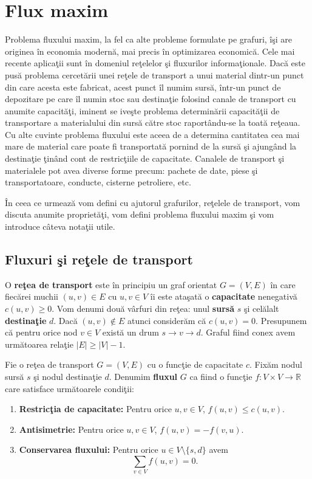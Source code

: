 \documentclass[11pt,a4paper]{report}
\newcommand{\R}{\mathbb{R}}
\begin{document}
 	\chapter{Flux maxim} 
 
 
 	Problema fluxului maxim, la fel ca alte probleme formulate pe grafuri, \^ i\c si are originea \^ in economia modern\u a, mai precis \^ in optimizarea economic\u a. Cele mai recente aplica\c tii sunt \^ in domeniul re\c telelor \c si fluxurilor informa\c tionale. Dac\u a este pus\u a problema cercet\u arii unei re\c tele de transport a unui material dintr-un punct din care acesta este fabricat, acest punct \^ il numim surs\u a, \^ intr-un punct de depozitare pe care \^ il numin stoc sau destina\c tie folosind canale de transport cu anumite capacit\u a\c ti, iminent se ive\c ste  problema determin\u arii capacit\u a\c tii de transportare a materialului din surs\u a c\u atre stoc raport\^ andu-se la toat\u a re\c teaua. Cu alte cuvinte problema fluxului este aceea de a determina cantitatea cea mai mare de material care poate fi transportat\u a pornind de la surs\u a \c si ajung\^ and la destina\c tie \c tin\^ and cont de restric\c tiile de capacitate. Canalele de transport \c si materialele pot avea diverse forme precum: pachete de date, piese \c si transportatoare, conducte, cisterne petroliere, etc.
 	
 	\^ In ceea ce urmeaz\u a vom defini cu ajutorul grafurilor, re\c telele de transport, vom discuta anumite propriet\u a\c ti, vom defini problema fluxului maxim \c si vom introduce c\^ ateva nota\c tii utile.
 	\section{Fluxuri \c si re\c tele de transport}
 	
 	O \textbf{re\c tea de transport} este \^ in principiu un graf orientat $G=(V,E)$ \^ in care fiec\u arei muchii $(u,v)\in E$ cu $u,v \in V$ \^ ii este ata\c sat\u a o \textbf{capacitate} nenegativ\u a $c(u,v)\geq 0$. Vom denumi dou\u a v\^ arfuri din re\c tea: unul \textbf{surs\u a} $s$ \c si cel\u alalt \textbf{destina\c tie} $d$. Dac\u a  $(u,v)\notin E$ atunci consider\u am c\u a $c(u,v)=0$. Presupunem c\u a pentru orice nod $v\in V$ exist\u a un drum $s\rightarrow v\rightarrow d$. Graful fiind conex avem urm\u atoarea rela\c tie $|E|\geq |V|-1$.
 	
 	Fie o re\c tea de transport $G=(V,E)$ cu o func\c tie de capacitate $c$. Fix\u am nodul surs\u a $s$ \c si nodul destina\c tie $d$. Denumim \textbf{fluxul} $G$ ca fiind o func\c tie $f:V\times V\rightarrow \R$ care satisface urm\u atoarele condi\c tii:
 	\begin{enumerate}
 		\item \textbf{Restric\c tia de capacitate:} Pentru orice $u,v\in V$, $f(u,v)\leq c(u,v)$.
 		\item \textbf{Antisimetrie:} Pentru orice   $u,v\in V$, $f(u,v)=-f(v,u)$.
 		\item \textbf{Conservarea fluxului:} Pentru orice $u\in V\setminus \{s,d\}$ avem
 		\begin{equation*}
 	\sum\limits_{v\in V} f(u,v)=0.
 		\end{equation*}
 	\end{enumerate}
 	
\end{document}
